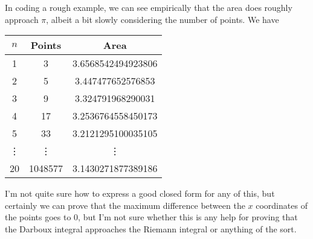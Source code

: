 \documentclass{article}
\begin{document}
In coding a rough example, we can see empirically that the area does roughly
approach \( \pi \), albeit a bit slowly considering the number of points. We have
\begin{center}
\begin{tabular}{c|c|c}
    \( n \) & Points & Area \\
    \hline
    1 & 3 & 3.6568542494923806\\
    2 & 5 &  3.447477652576853 \\
    3 & 9 &  3.324791968290031 \\
    4 & 17 & 3.2536764558450173 \\
    5 & 33 & 3.2121295100035105 \\
    \vdots & \vdots & \vdots \\
    20 & 1048577 & 3.1430271877389186 
\end{tabular}
\end{center}
I'm not quite sure how to express a good closed form for any of this, but
certainly we can prove that the maximum difference between the \( x \)
coordinates of the points goes to \( 0 \), but I'm not sure whether this is any
help for proving that the Darboux integral approaches the Riemann integral or
anything of the sort.
\end{document}
